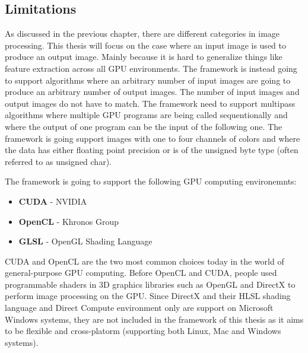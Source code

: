\subsection{Limitations}

As discussed in the previous chapter, there are different categories in image processing. This thesis will focus on the case where an input image is used to produce an output image. Mainly because it is hard to generalize things like feature extraction across all GPU environments. The framework is instead going to support algorithms where an arbitrary number of input images are going to produce an arbitrary number of output images. The number of input images and output images do not have to match. The framework need to support multipass algorithms where multiple GPU programs are being called sequentionally and where the output of one program can be the input of the following one. The framework is going support images with one to four channels of colors and where the data has either floating point precision or is of the unsigned byte type (often referred to as unsigned char).
\newline

The framework is going to support the following GPU computing environemnts:

\begin{itemize}
\item{{\bf CUDA} - NVIDIA}
\item{{\bf OpenCL} - Khronos Group}
\item{{\bf GLSL} - OpenGL Shading Language}
\end{itemize}

CUDA and OpenCL are the two most common choices today in the world of general-purpose GPU computing. Before OpenCL and CUDA, people used programmable shaders in 3D graphics libraries such as OpenGL and DirectX to perform image processing on the GPU. Since DirectX and their HLSL shading language and Direct Compute environment only are support on Microsoft Windows systems, they are not included in the framework of this thesis as it aims to be flexible and cross-platorm (supporting both Linux, Mac and Windows systems).
